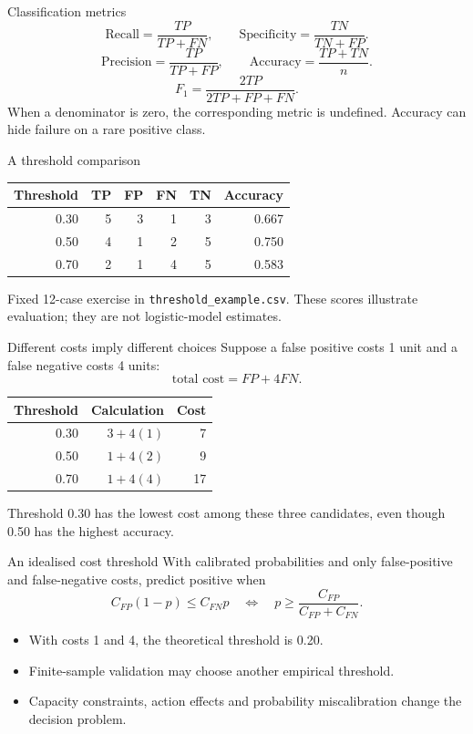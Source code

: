 \begin{frame}{Classification metrics}
\[\text{Recall}=\frac{TP}{TP+FN},\qquad\text{Specificity}=\frac{TN}{TN+FP}.\]\[\text{Precision}=\frac{TP}{TP+FP},\qquad\text{Accuracy}=\frac{TP+TN}{n}.\]\[F_1=\frac{2TP}{2TP+FP+FN}.\]When a denominator is zero, the corresponding metric is undefined. Accuracy can hide failure on a rare positive class.
\end{frame}

\begin{frame}{A threshold comparison}
\begin{center}\begin{tabular}{rrrrrr}\toprule
Threshold & TP & FP & FN & TN & Accuracy\\\midrule 0.30 & 5 & 3 & 1 & 3 & 0.667\\0.50 & 4 & 1 & 2 & 5 & 0.750\\0.70 & 2 & 1 & 4 & 5 & 0.583\\
\bottomrule\end{tabular}\end{center}Fixed 12-case exercise in \texttt{threshold\_example.csv}. These scores illustrate evaluation; they are not logistic-model estimates.
\end{frame}

\begin{frame}{Different costs imply different choices}
Suppose a false positive costs 1 unit and a false negative costs 4 units:\[\text{total cost}=FP+4FN.\]\begin{center}\begin{tabular}{rrr}\toprule
Threshold & Calculation & Cost\\\midrule 0.30 & $3+4(1)$ & 7\\0.50 & $1+4(2)$ & 9\\0.70 & $1+4(4)$ & 17\\
\bottomrule\end{tabular}\end{center}Threshold 0.30 has the lowest cost among these three candidates, even though 0.50 has the highest accuracy.
\end{frame}

\begin{frame}{An idealised cost threshold}
With calibrated probabilities and only false-positive and false-negative costs, predict positive when\[C_{FP}(1-p)\le C_{FN}p\quad\Longleftrightarrow\quad p\ge\frac{C_{FP}}{C_{FP}+C_{FN}}.\]\begin{itemize}
\item With costs 1 and 4, the theoretical threshold is 0.20.
\item Finite-sample validation may choose another empirical threshold.
\item Capacity constraints, action effects and probability miscalibration change the decision problem.
\end{itemize}
\end{frame}

